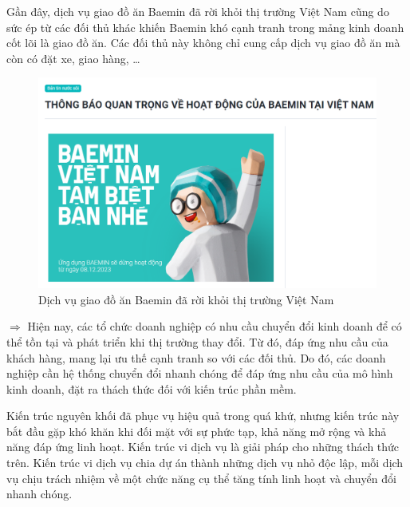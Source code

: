 \begin{example} Gần đây, dịch vụ giao đồ ăn Baemin đã rời khỏi thị trường Việt Nam cũng do sức ép từ các đối thủ khác khiến Baemin khó cạnh tranh trong mảng kinh doanh cốt lõi là giao đồ ăn. Các đối thủ này không chỉ cung cấp dịch vụ giao đồ ăn mà còn có đặt xe, giao hàng, \dots

\end{example}

\begin{figure}[H]

\centering

\includegraphics[scale = 0.5]{pictures/_baemin/main.png}

\caption{Dịch vụ giao đồ ăn Baemin đã rời khỏi thị trường Việt Nam}

\end{figure}

$\Rightarrow$ Hiện nay, các tổ chức doanh nghiệp có nhu cầu chuyển đổi kinh doanh để có thể tồn tại và phát triển khi thị trường thay đổi. Từ đó, đáp ứng nhu cầu của khách hàng, mang lại ưu thế cạnh tranh so với các đối thủ. Do đó, các doanh nghiệp cần hệ thống chuyển đổi nhanh chóng để đáp ứng nhu cầu của mô hình kinh doanh, đặt ra thách thức đối với kiến trúc phần mềm.

Kiến trúc nguyên khối đã phục vụ hiệu quả trong quá khứ, nhưng kiến trúc này bắt đầu gặp khó khăn khi đối mặt với sự phức tạp, khả năng mở rộng và khả năng đáp ứng linh hoạt. Kiến trúc vi dịch vụ là giải pháp cho những thách thức trên. Kiến trúc vi dịch vụ chia dự án thành những dịch vụ nhỏ độc lập, mỗi dịch vụ chịu trách nhiệm về một chức năng cụ thể tăng tính linh hoạt và chuyển đổi nhanh chóng.